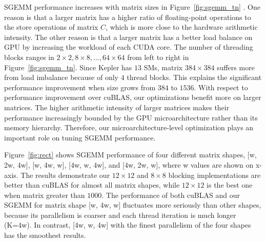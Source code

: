 SGEMM performance increases with matrix sizes in Figure~\ref{fig:sgemm_tn} . 
One reason is that a larger matrix has a higher ratio of 
floating-point operations to the store operations of matrix $C$, which is more close to the hardware arithmetic intensity. 
The other reason is that a larger matrix has a better load balance on GPU by increasing the workload of each CUDA core.
The number of threading blocks ranges in $2 \times 2, 8 \times 8, \dots, 64 \times 64$ from left to right in Figure~\ref{fig:sgemm_tn}.
Since Kepler has $13$ SMs, matrix $384\times 384$ suffers more from load imbalance because of only $4$ thread blocks.
This explains the significant performance improvement when size grows from $384$ to $1536$. 
With respect to performance improvement over cuBLAS, our optimizations benefit more on larger matrices. 
The higher arithmetic intensity of larger matrices makes their performance increasingly bounded by the GPU microarchitecture rather than its memory hierarchy. 
Therefore, our microarchitecture-level optimization plays an important role on tuning SGEMM
performance.



Figure~\ref{fig:rect} shows SGEMM performance of four different matrix shapes, [w, 2w, 4w], [w, 4w, w], [4w, w, 4w], and [4w, 2w, w], where w values are shown on x-axis.
The results demonstrate our $12\times12$ and $8\times8$ blocking implementations are better than cuBLAS for almost all matrix shapes, while $12\times12$ is the best one when matrix greater than $1000$.
The performance of both cuBLAS and our SGEMM for matrix shape [w, 4w, w] fluctuates more seriously than other shapes, because its parallelism is coarser and each thread iteration is much longer (K=4w).
In contrast, [4w, w, 4w] with the finest parallelism of the four shapes has the smoothest results.

